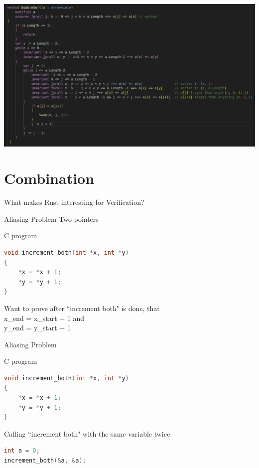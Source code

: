 \documentclass{beamer}
\begin{document}
\begin{frame}
\begin{center}
\includegraphics[scale=0.3]{pictures/verification/bubblesort_annotated.png}
\end{center}
\end{frame}

\section{Combination}
\begin{frame}{}
\begin{center}
What makes Rust interesting for Verification?
\end{center}
\end{frame}


\begin{frame}[fragile]{Aliasing Problem}
Two pointers
\begin{block}{C program}
\begin{lstlisting}[language=C]
void increment_both(int *x, int *y)
{
    *x = *x + 1; 
    *y = *y + 1;   
}
 \end{lstlisting}
\end{block}

Want to prove after ``increment both" is done, that\\
x\_end = x\_start + 1 and \\
y\_end = y\_start + 1

\end{frame}

\begin{frame}[fragile]{Aliasing Problem}
\begin{block}{C program}
\begin{lstlisting}[language=C]
void increment_both(int *x, int *y)
{
    *x = *x + 1; 
    *y = *y + 1;   
}
 \end{lstlisting}
\end{block}

\begin{block}{Calling ``increment both" with the same variable twice}
\begin{lstlisting}[language=C]
int a = 0;
increment_both(&a, &a); 
\end{lstlisting}
\end{block}
\end{frame}
\end{document}
